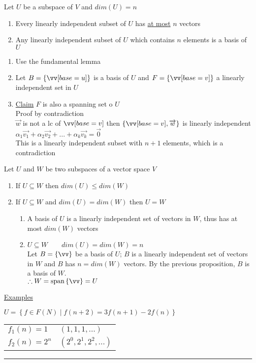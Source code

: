 \documentclass[12pt]{article}
\renewcommand{\v}[1]{\overrightarrow{#1}}
\newcommand{\vectorseqtwo}[2]{#1_1\v{#2_1} + #1_2\v{#2_2} + ... + #1_k\v{#2_k}}
\newenvironment{proof}{\block[Proof]}{\endblock}
\newenvironment{proposition}{\block[Proposition]}{\endblock}
\newenvironment{examples}{\shownto{-,compact}\underline{Examples}\enumerate}{\endenumerate\divider\endshownto}
\newcommand{\bb}[1]{\left\{#1\right\}}
\newcommand{\divider}[0]{\textcolor{lightgray}{\rule{\textwidth}{0.1pt}}}
\newcommand{\sspan}[1]{\text{span}\bb{#1}}
\begin{document}
\begin{proposition}
	Let $U$ be a subspace of $V$ and $dim(U) = n$
	
	\begin{enumerate}
		\item Every linearly independent subset of $U$ has \underline{at most} $n$ vectors
		\item Any linearly independent subset of $U$ which contains $n$ elements is a basis of $U$
	\end{enumerate}

	\begin{proof}
		\begin{enumerate}
			\item Use the fundamental lemma
			\item Let $B = \bb{\vv[base=u]}$ is a basis of $U$ and $F = \bb{\vv[base=v]}$ a linearly independent set in $U$
			\item \underline{Claim} $F$ is also a spanning set o $U$ \\
			Proof by contradiction \\
			$\v{w}$ is not a lc of $\vv[base=v]$ then $\bb{\vv[base=v], \v{w}}$ is linearly independent \\
			$\vectorseqtwo{\alpha}{v} = \v{0}$ \\
			This is a linearly independent subset with $n + 1$ elements, which is a contradiction
		\end{enumerate}
	\end{proof}
\end{proposition}

\begin{proposition}
	Let $U$ and $W$ be two subspaces of a vector space $V$
	\begin{enumerate}
		\item If $U \subseteq W$ then $dim(U) \le dim(W)$ 
		\item If $U \subseteq W$ and $dim(U) = dim(W)$ then $U = W$
		\begin{proof}
			\begin{enumerate}
				\item A basis of $U$ is a linearly independent set of vectors in $W$, thus has at most $dim(W)$ vectors
				\item $U \subseteq W \qquad dim(U) = dim(W) = n$ \\
				Let $B = \bb{\vv}$ be a basis of $U$; $B$ is a linearly independent set of vectors in $W$ and $B$ has $n = dim(W)$ vectors. By the previous proposition, $B$ is a basis of $W$. \\
				$\therefore W = \sspan{\vv} = U$
			\end{enumerate}
		\end{proof}
	\end{enumerate}
\end{proposition}

\begin{examples}
	\item $U = \bb{f \in F(N) \mid f(n + 2) = 3f(n + 1) - 2f(n)}$ \\
	\begin{tabular}{@{} l l}
		$f_1(n) = 1$ & $(1, 1, 1, ...)$ \\
		$f_2(n) = 2^n$ & $(2^0, 2^1, 2^2, ...)$
	\end{tabular}
\end{examples}
\end{document}
